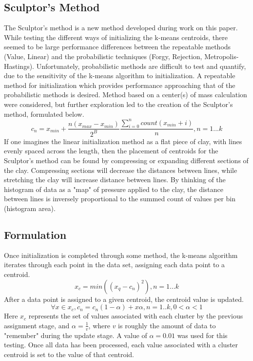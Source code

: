 \documentclass[journal]{IEEEtran}
\begin{document}
\subsection{Sculptor's Method}
The Sculptor's method is a new method developed during work on this paper. While testing the different ways of initializing the k-means centroids, there
seemed to be large performance differences between the repeatable methods (Value, Linear) and the probabilistic techniques (Forgy, Rejection, 
Metropolis-Hastings). Unfortunately, probabilistic methods are difficult to test and quantify, due to the sensitivity of the k-means algorithm to
initialization. A repeatable method for initialization which provides performance approaching that of the probabilistic methods is desired. 
Method based on a center(s) of mass calculation were considered, but further exploration led to the creation of the 
Sculptor's method, formulated below.
\begin{equation}
    c_n = x_{min} + \frac{n(x_{max}-x_{min})}{2^B}\frac{\sum_{i=0}^{n}count(x_{min}+i)}{n}, n = 1...k 
\end{equation}
If one imagines the linear initialization method as a flat piece of clay, with lines evenly spaced across the length, then the placement of
centroids for the Sculptor's method can be found by compressing or expanding different sections of the clay. Compressing sections will decrease the
distances between lines, while stretching the clay will increase distance between lines. By thinking of the histogram of data as a "map" of pressure
applied to the clay, the distance between lines is inversely proportional to the summed count of values per bin (histogram area).

\subsection{Formulation}
Once initialization is completed through some method, the k-means algorithm iterates through each point in the data set, assigning each data point to a
centroid.
\begin{equation}
    x_c = min((x_q - c_n)^2), n = 1...k
\end{equation}
After a data point is assigned to a given centroid, the centroid value is updated.
\begin{equation}
    \forall x \in {x_c}, c_n = c_n(1-\alpha) + x\alpha, n = 1..k, 0 < \alpha < 1
\end{equation}
Here $x_c$ represents the set of values associated with each cluster by the previous assignment stage, and $\alpha = \frac{1}{v}$, where $v$
is roughly the amount of data to "remember" during the update stage. A value of $\alpha = 0.01$ was used for this testing.
Once all data has been processed, each value associated with a cluster centroid is set to the value of that centroid. \cite{meansWeb}
\end{document}
